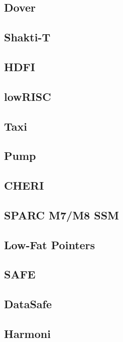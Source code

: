 \subsection{Dover}


\subsection{Shakti-T}

\subsection{HDFI}

\subsection{lowRISC}

\subsection{Taxi}

\subsection{Pump}

\subsection{CHERI}

\subsection{SPARC M7/M8 SSM}

\subsection{Low-Fat Pointers}

\subsection{SAFE}

\subsection{DataSafe}

\subsection{Harmoni}

